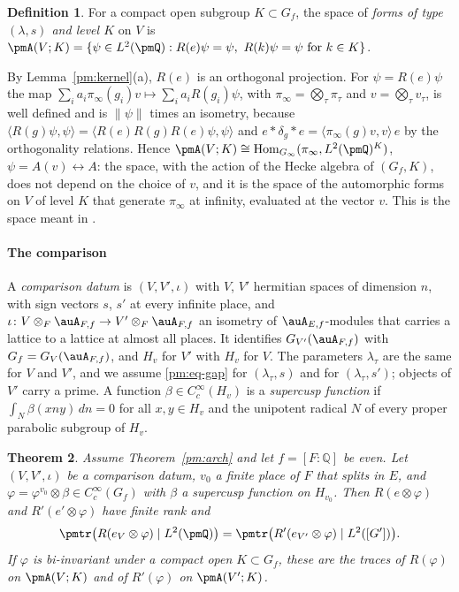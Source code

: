 \documentclass[10pt]{amsart}
\newtheorem{theorem}{Theorem}[section]
\theoremstyle{definition}
\newtheorem{definition}[theorem]{Definition}
\theoremstyle{remark}
\newcommand{\Q}{\mathbb Q}
\begin{document}
\begin{definition}\label{pm:def-forms}
For a compact open subgroup $K\subset G_f$, the space of \emph{forms of type $(\lambda,s)$ and
level $K$} on $V$ is
$\pmA(V;K)=\{\psi\in L^2(\pmQ):R(e)\psi=\psi,\ R(k)\psi=\psi\text{ for }k\in K\}$.
\end{definition}

By Lemma~\ref{pm:kernel}(a), $R(e)$ is an orthogonal projection. For $\psi=R(e)\psi$ the map
$\sum_ia_i\pi_\infty(g_i)v\mapsto\sum_ia_iR(g_i)\psi$, with $\pi_\infty=\bigotimes_\tau\pi_\tau$ and
$v=\bigotimes_\tau v_\tau$, is well defined and is $\|\psi\|$ times an isometry, because
$\langle R(g)\psi,\psi\rangle=\langle R(e)R(g)R(e)\psi,\psi\rangle$ and $e*\delta_g*e=
\langle\pi_\infty(g)v,v\rangle\,e$ by the orthogonality relations. Hence
$\pmA(V;K)\cong\operatorname{Hom}_{G_\infty}(\pi_\infty,L^2(\pmQ)^K)$, $\psi=A(v)\leftrightarrow A$:
the space, with the action of the Hecke algebra of $(G_f,K)$, does not depend on the choice of
$v$, and it is the space of the automorphic forms on $V$ of level $K$ that generate $\pi_\infty$
at infinity, evaluated at the vector $v$. This is the space meant in {\cite[\S14.3]{P46}}.

\paragraph*{The comparison}
A \emph{comparison datum} is $(V,V',\iota)$ with $V$, $V'$ hermitian spaces of dimension $n$, with
sign vectors $s$, $s'$ at every infinite place, and $\iota\colon V\otimes_F\auA_{F,f}\to V'\otimes_F
\auA_{F,f}$ an isometry of $\auA_{E,f}$-modules that carries a lattice to a lattice at almost all
places. It identifies $G_{V'}(\auA_{F,f})$ with $G_f=G_V(\auA_{F,f})$, and $H_v$ for $V'$ with
$H_v$ for $V$. The parameters $\lambda_\tau$ are the same for $V$ and $V'$, and we assume
\eqref{pm:eq-gap} for $(\lambda_\tau,s)$ and for $(\lambda_\tau,s')$; objects of $V'$ carry a
prime. A function $\beta\in C_c^\infty(H_v)$ is a \emph{supercusp function} if
$\int_N\beta(xny)\,dn=0$ for all $x,y\in H_v$ and the unipotent radical $N$ of every proper
parabolic subgroup of $H_v$.

\begin{theorem}\label{pm:main}
Assume Theorem~\ref{pm:arch} and let $f=[F:\Q]$ be even. Let $(V,V',\iota)$ be a comparison datum,
$v_0$ a finite place of $F$ that splits in $E$, and $\varphi=\varphi^{v_0}\otimes\beta\in
C_c^\infty(G_f)$ with $\beta$ a supercusp function on $H_{v_0}$. Then $R(e\otimes\varphi)$ and
$R'(e'\otimes\varphi)$ have finite rank and
\[
\pmtr\bigl(R(e_V\otimes\varphi)\mid L^2(\pmQ)\bigr)=\pmtr\bigl(R'(e_{V'}\otimes\varphi)\mid
L^2([G'])\bigr).
\]
If $\varphi$ is bi-invariant under a compact open $K\subset G_f$, these are the traces of
$R(\varphi)$ on $\pmA(V;K)$ and of $R'(\varphi)$ on $\pmA(V';K)$.
\end{theorem}
\end{document}
